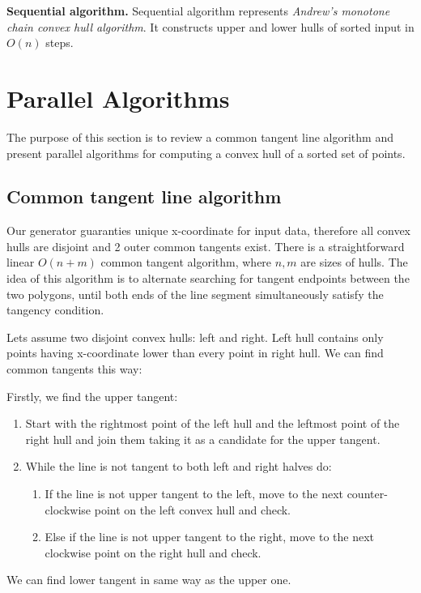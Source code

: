 \documentclass[letterpaper]{article}
\newcommand{\mypar}[1]{{\bf #1.}}
\theoremstyle{definition}
\begin{document}
\mypar{Sequential algorithm}
Sequential algorithm represents \textit{Andrew's monotone chain convex hull algorithm}. It constructs upper and lower hulls of sorted input in $O(n)$ steps. \cite{DBLP:journals/ipl/Andrew79} 

\section{Parallel Algorithms}\label{sec:yourmethod}

The purpose of this section is to review a common tangent line algorithm and present parallel algorithms for computing a convex hull of a sorted set of points.

\subsection{Common tangent line algorithm}

Our generator guaranties unique x-coordinate for input data, therefore all convex hulls are disjoint and 2 outer common tangents exist. There is a straightforward linear $O(n+m)$ common tangent algorithm, where $n,m$ are sizes of hulls. The idea of this algorithm is to alternate searching for tangent endpoints between the two polygons, until both ends of the line segment simultaneously satisfy the tangency condition. 

Lets assume two disjoint convex hulls: left and right. Left hull contains only points having x-coordinate lower than every point in right hull. We can find common tangents this way:
 
Firstly, we find the upper tangent:
	\begin{enumerate}
		\item Start with the rightmost point of the left hull and the leftmost point of the right hull and join them taking it as a candidate for the upper tangent.
		\item While the line is not tangent to both left and right halves do:
		\begin{enumerate}
			\item If the line is not upper tangent to the left, move to the next counter-clockwise point on the left convex hull and check.
			\item Else if the line is not upper tangent to the right, move to the next clockwise point on the right hull and check.
		\end{enumerate}
	\end{enumerate}
	 We can find lower tangent in same way as the upper one.\\ 
\end{document}

